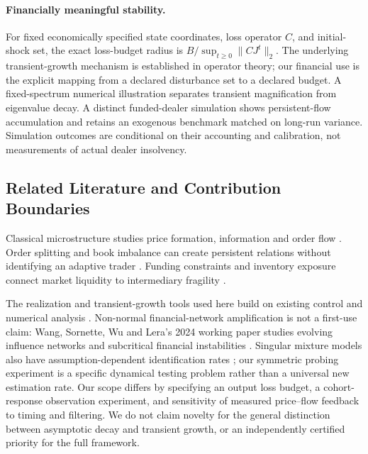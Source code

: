 \documentclass[12pt]{article}
\theoremstyle{definition}
\theoremstyle{remark}
\begin{document}
\paragraph{Financially meaningful stability.}
For fixed economically specified state coordinates, loss operator $C$, and initial-shock set, the exact loss-budget radius is $B/\sup_{t\ge0}\|CJ^t\|_2$. The underlying transient-growth mechanism is established in operator theory; our financial use is the explicit mapping from a declared disturbance set to a declared budget. A fixed-spectrum numerical illustration separates transient magnification from eigenvalue decay. A distinct funded-dealer simulation shows persistent-flow accumulation and retains an exogenous benchmark matched on long-run variance. Simulation outcomes are conditional on their accounting and calibration, not measurements of actual dealer insolvency.

\subsection{Related Literature and Contribution Boundaries}
Classical microstructure studies price formation, information and order flow \citep{kyle1985continuous,glosten1985bid,hasbrouck1991}. Order splitting and book imbalance can create persistent relations without identifying an adaptive trader \citep{bouchaud2004fluctuations,cont2014}. Funding constraints and inventory exposure connect market liquidity to intermediary fragility \citep{brunnermeier2009,adrian2010liquidity,greenwood2015vulnerable}.

The realization and transient-growth tools used here build on existing control and numerical analysis \citep{gilbert1963,kreiss1962,spijker1991,trefethen2005spectra}. Non-normal financial-network amplification is not a first-use claim: Wang, Sornette, Wu and Lera's 2024 working paper studies evolving influence networks and subcritical financial instabilities \citep{wang2024}. Singular mixture models also have assumption-dependent identification rates \citep{manole2022}; our symmetric probing experiment is a specific dynamical testing problem rather than a universal new estimation rate. Our scope differs by specifying an output loss budget, a cohort-response observation experiment, and sensitivity of measured price--flow feedback to timing and filtering. We do not claim novelty for the general distinction between asymptotic decay and transient growth, or an independently certified priority for the full framework.
\end{document}
